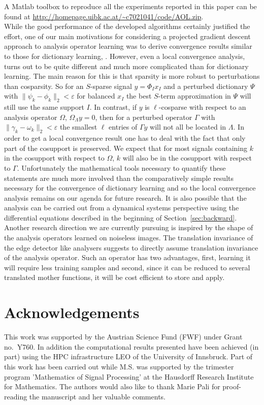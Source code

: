 \documentclass[11pt, onecolumn, journal,compsoc]{IEEEtran}
\newcommand\eps{\varepsilon}
\newcommand\dico{\Phi}
\newcommand\atom{\phi}
\newcommand\pdico{\Psi}
\newcommand\patom{\psi}
\theoremstyle{plain}
\theoremstyle{remark}
\begin{document}
A Matlab toolbox to reproduce all the experiments reported in this paper can be found at \url{http://homepage.uibk.ac.at/~c7021041/code/AOL.zip}.\\
%
%
While the good performance of the developed algorithms certainly justified the effort, one of our main motivations for considering a projected gradient descent approach to analysis operator learning was to derive convergence results similar to those for dictionary learning, \cite{sc15}.
However, even a local convergence analysis, turns out to be quite different and much more complicated than for dictionary learning. The main reason for this is that sparsity is more robust to perturbations than cosparsity. So for an $S$-sparse signal $y=\dico_I x_I$ and a perturbed dictionary $\pdico$ with $\|\patom_k-\atom_k\|_2<\eps$ for balanced $x_I$ the best $S$-term approximation in $\pdico$ will still use the same support $I$. In contrast, if $y$ is $\ell$-cosparse with respect to an analysis operator $\Omega$, $\Omega_\Lambda y =0$, then for a perturbed operator $\Gamma$ with $\|\gamma_k-\omega_k\|_2<\eps$ the smallest $\ell$ entries of $\Gamma y$ will not all be located in $\Lambda$. In order to get a local convergence result one has to deal with the fact that only part of the cosupport is preserved. We expect that for most signals containing $k$ in the cosupport with respect to $\Omega$, $k$ will also be in the cosupport with respect to $\Gamma$. Unfortunately the mathematical tools necessary to quantify these statements are much more involved than the comparatively simple results necessary for the convergence of dictionary learning and so the local convergence analysis remains on our agenda for future research. It is also possible that the analysis can be carried out from a dynamical systems perspective using the differential equations described in the beginning of Section~\ref{sec:backward}.\\
Another research direction we are currently pursuing is inspired by the shape of the analysis operators learned on noiseless images. The translation invariance of the edge detector like analysers suggests to directly assume translation invariance of the analysis operator. Such an operator has two advantages, first, learning it will require less training samples and second, since it can be reduced to several translated mother functions, it will be cost efficient to store and apply.

\section*{Acknowledgements}
This work was supported by the Austrian Science Fund (FWF) under Grant no.~Y760.
In addition the computational results presented have been achieved (in part) using the HPC infrastructure LEO of the University of Innsbruck.
Part of this work has been carried out while M.S. was supported by the trimester program 'Mathematics of Signal Processing' at the Hausdorff Research Institute for Mathematics.
The authors would also like to thank Marie Pali for proof-reading the manuscript and her valuable comments.
\end{document}
